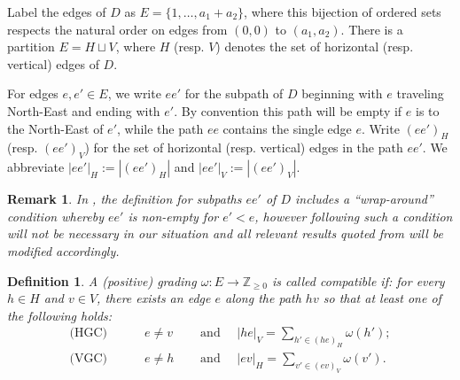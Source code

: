 \documentclass{amsart}
\newtheorem{definition}[theorem]{Definition}
\newtheorem{remark}[theorem]{Remark}
\newcommand{\ZZ}{\mathbb{Z}}
\begin{document}
Label the edges of $D$ as $E=\{1,\ldots,a_1+a_2\}$, where this bijection of ordered sets respects the natural order on edges from $(0,0)$ to $(a_1,a_2)$.  There is a partition $E=H\sqcup V$, where $H$ (resp. $V$) denotes the set of horizontal (resp. vertical) edges of $D$. 

For edges $e,e'\in E$, we write $ee'$ for the subpath of $D$ beginning with $e$ traveling North-East and ending with $e'$.  By convention this path will be empty if $e$ is to the North-East of $e'$, while the path $ee$ contains the single edge $e$.  Write $(ee')_H$ (resp. $(ee')_V$) for the set of horizontal (resp. vertical) edges in the path $ee'$.
We abbreviate $|ee'|_H:=|(ee')_H|$ and $|ee'|_V:=|(ee')_V|$.
\begin{remark}
 In \cite{rupel2}, the definition for subpaths $ee'$ of $D$ includes a ``wrap-around'' condition whereby $ee'$ is non-empty for $e'<e$, however following \cite[Remark 2.22]{rupel2} such a condition will not be necessary in our situation and all relevant results quoted from \cite{rupel2} will be modified accordingly.
\end{remark}

\begin{definition}\label{def:compatibility}
  A (\emph{positive}) \emph{grading} $\omega:E\to\ZZ_{\ge0}$ is called \emph{compatible} if: for every $h\in H$ and $v\in V$, there exists an edge $e$ along the path $hv$ so that at least one of the following holds:
  \begin{align*}
    \text{(HGC)}\quad\quad\quad e\ne v\quad&\text{ and }\quad |he|_V=\sum\limits_{h'\in(he)_H} \omega(h');\\
    \text{(VGC)}\quad\quad\quad e\ne h\quad&\text{ and }\quad |ev|_H=\sum\limits_{v'\in(ev)_V} \omega(v').
  \end{align*}
\end{definition}
\end{document}
